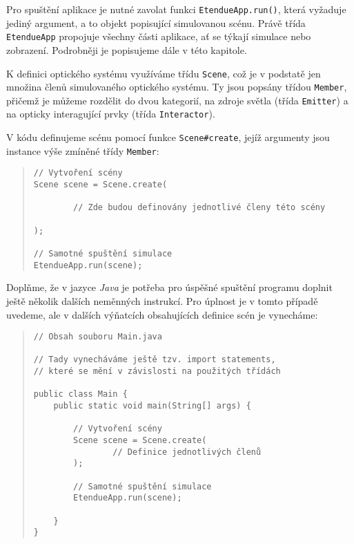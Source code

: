 Pro spuštění aplikace je nutné zavolat funkci \texttt{EtendueApp.run()}, která vyžaduje jediný argument, a to objekt popisující simulovanou scénu. Právě třída \texttt{EtendueApp} propojuje všechny části aplikace, ať se týkají simulace nebo zobrazení. Podrobněji je popisujeme dále v této kapitole.

K definici optického systému využíváme třídu \texttt{Scene}, což je v podstatě jen množina členů simulovaného optického systému. Ty jsou popsány třídou \texttt{Member}, přičemž je můžeme rozdělit do dvou kategorií, na zdroje světla (třída \texttt{Emitter}) a na opticky interagující prvky (třída \texttt{Interactor}).

V kódu definujeme scénu pomocí funkce \texttt{Scene\#create}, jejíž argumenty jsou instance výše zmíněné třídy \texttt{Member}:

\begin{minipage}{\textwidth}\begin{quote}\begin{lstlisting}
// Vytvoření scény
Scene scene = Scene.create(

        // Zde budou definovány jednotlivé členy této scény

);

// Samotné spuštění simulace
EtendueApp.run(scene);
\end{lstlisting}\end{quote}\end{minipage}

Doplňme, že v jazyce \emph{Java} je potřeba pro úspěšné spuštění programu doplnit ještě několik dalších neměnných instrukcí. Pro úplnost je v tomto případě uvedeme, ale v dalších výňatcích obsahujících definice scén je vynecháme:

\begin{minipage}{\textwidth}\begin{quote}\begin{lstlisting}
// Obsah souboru Main.java

// Tady vynecháváme ještě tzv. import statements,
// které se mění v závislosti na použitých třídách

public class Main {
    public static void main(String[] args) {

        // Vytvoření scény
        Scene scene = Scene.create(
                // Definice jednotlivých členů
        );

        // Samotné spuštění simulace
        EtendueApp.run(scene);

    }
}
\end{lstlisting}\end{quote}\end{minipage}

